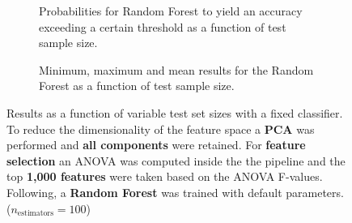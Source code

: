 \begin{figure}
    \captionsetup[subfigure]{justification=justified,singlelinecheck=false}
    \begin{subfigure}[t]{0.61\textwidth}
        
        \caption{Probabilities for Random Forest to yield an accuracy exceeding a certain threshold as a function of test sample size.}
    \end{subfigure}
    \hspace{3.0mm}
    \begin{subfigure}[t]{0.34\textwidth}
        
        \caption{Minimum, maximum and mean results for the Random Forest as a function of test sample size.}
    \end{subfigure}
    \caption[Effects of varying test sample size. Random Forest; Preprocessing: PCA ($n_\text{components} = \text{all}$); ANOVA feature selection ($k_\text{best} = \num{1000}$)]{Results as a function of variable test set sizes with a fixed classifier. To reduce the dimensionality of the feature space a \textbf{PCA} was performed and \textbf{all components} were retained. For \textbf{feature selection} an ANOVA was computed inside the the pipeline and the top \textbf{1,000 features} were taken based on the ANOVA F-values. Following, a \textbf{{Random Forest}} was trained with default parameters. ($n_\text{estimators}=\num{100}$)}
    \label{fig:PCA_all_components_1000_best_selected_RandomForest}
\end{figure}

